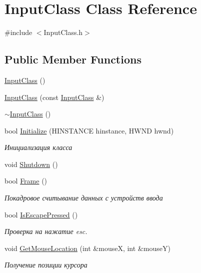 \hypertarget{class_input_class}{}\section{Input\+Class Class Reference}
\label{class_input_class}


{\ttfamily \#include $<$Input\+Class.\+h$>$}

\subsection*{Public Member Functions}
\begin{DoxyCompactItemize}
\item 
\hyperlink{class_input_class_a5bdb6c4005f53a1e7da0cf5d520c96c1}{Input\+Class} ()
\item 
\hyperlink{class_input_class_a90666acaee782bd2f19f09053d3a4f8b}{Input\+Class} (const \hyperlink{class_input_class}{Input\+Class} \&)
\item 
\hyperlink{class_input_class_a861f917dd9d8148175570da894131c14}{$\sim$\+Input\+Class} ()
\item 
bool \hyperlink{class_input_class_a6ced28e35340b1bf5d8bdca393516a29}{Initialize} (H\+I\+N\+S\+T\+A\+N\+CE hinstance, H\+W\+ND hwnd)
\begin{DoxyCompactList}\small\item\em Инициализация класса \end{DoxyCompactList}\item 
void \hyperlink{class_input_class_adf350e0bf594df0c34cd995b799b5eee}{Shutdown} ()
\item 
bool \hyperlink{class_input_class_a5c5cec23229834dc6627e211bb1f59cb}{Frame} ()
\begin{DoxyCompactList}\small\item\em Покадровое считывание данных с устройств ввода \end{DoxyCompactList}\item 
bool \hyperlink{class_input_class_afdb28f06d2d6fb17e16e9b51a8237fed}{Is\+Escape\+Pressed} ()
\begin{DoxyCompactList}\small\item\em Проверка на нажатие esc. \end{DoxyCompactList}\item 
void \hyperlink{class_input_class_a447bd4da31fb87f8ce2dc964449a3566}{Get\+Mouse\+Location} (int \&mouseX, int \&mouseY)
\begin{DoxyCompactList}\small\item\em Получение позиции курсора \end{DoxyCompactList}\item 

\end{DoxyCompactItemize}
